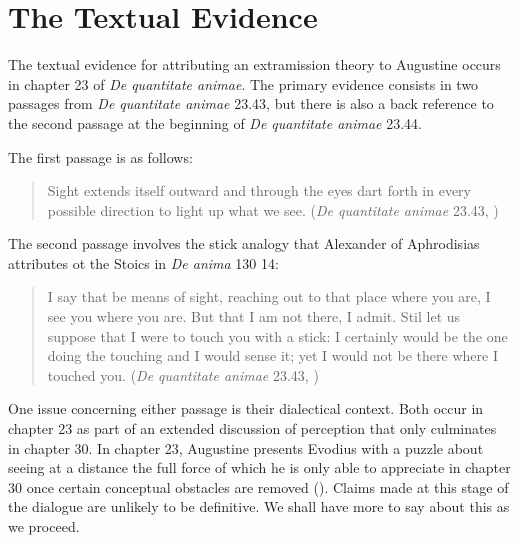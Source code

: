 \documentclass[12pt]{article}
\begin{document}
\section{The Textual Evidence} %
\label{sec:the_textual_evidence}

The textual evidence for attributing an extramission theory to Augustine occurs in chapter 23 of \emph{De quantitate animae}. The primary evidence consists in two passages from \emph{De quantitate animae} 23.43, but there is also a back reference to the second passage at the beginning of \emph{De quantitate animae} 23.44.

The first passage is as follows:
\begin{quote}
	Sight extends itself outward and through the eyes dart forth in every possible direction to light up what we see. (\emph{De quantitate animae} 23.43, \citealt[66]{Colleran:1949ys}) 
\end{quote}
The second passage involves the stick analogy that Alexander of Aphrodisias attributes ot the Stoics in \emph{De anima} 130 14:
\begin{quote}
	I say that be means of sight, reaching out to that place where you are, I see you where you are. But that I am not there, I admit. Stil let us suppose that I were to touch you with a stick: I certainly would be the one doing the touching and I would sense it; yet I would not be there where I touched you. (\emph{De quantitate animae} 23.43, \citealt[66]{Colleran:1949ys}) 
\end{quote}

One issue concerning either passage is their dialectical context. Both occur in chapter 23 as part of an extended discussion of perception that only culminates in chapter 30. In chapter 23, Augustine presents Evodius with a puzzle about seeing at a distance the full force of which he is only able to appreciate in chapter 30 once certain conceptual obstacles are removed (). Claims made at this stage of the dialogue are unlikely to be definitive. We shall have more to say about this as we proceed.
\end{document}
